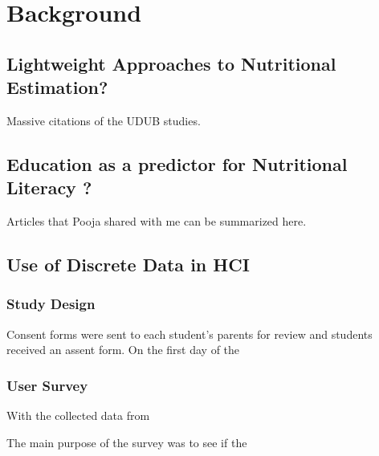 \section{Background}



\subsection{Lightweight Approaches to Nutritional Estimation?}

Massive citations of the UDUB studies. 

\subsection{Education as a predictor for Nutritional Literacy ?}

Articles that Pooja shared with me can be summarized here. 

\subsection{Use of Discrete Data in HCI}



\subsubsection{Study Design}
Consent forms were sent to each student's parents for review and students received an assent form. On the first day of the 




\subsubsection{User Survey}
With the collected data from 

The main purpose of the survey was to see if the